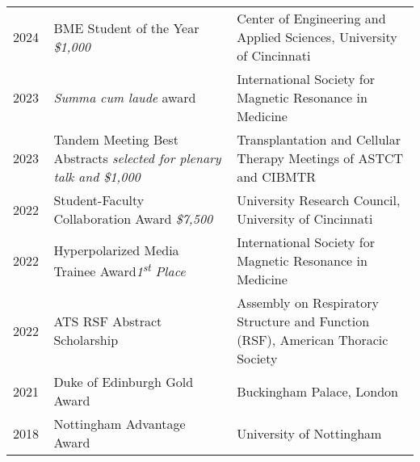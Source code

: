 \documentclass[12pt,]{scrartcl}
\begin{document}
\begin{table}[!h]
{\def\arraystretch{1.5}\tabcolsep=0pt
\begin{tabular}{p{0.10\linewidth}p{0.45\linewidth}p{0.45\linewidth}}
    2024 & BME Student of the Year \newline \textit{\$1,000}  & Center of Engineering and Applied Sciences, University of Cincinnati \\
    
    2023 & \textit{Summa cum laude} award & International Society for Magnetic Resonance in Medicine \\

    
    2023 & Tandem Meeting Best Abstracts \newline \textit{selected for plenary talk and \$1,000}  & Transplantation and Cellular Therapy \newline Meetings of ASTCT and CIBMTR \\
    
    2022 & Student-Faculty Collaboration Award \newline \textit{\$7,500} & University Research Council, University of Cincinnati \\
    
    2022 & Hyperpolarized Media Trainee Award\newline \textit{1\textsuperscript{st} Place} & International Society for Magnetic Resonance in Medicine \\
    
    
    2022 & ATS RSF Abstract Scholarship & Assembly on Respiratory Structure and Function (RSF), American Thoracic Society \\ 

  
  2021 & Duke of Edinburgh Gold Award & Buckingham Palace, London \\
  
  2018 & Nottingham Advantage Award & University of Nottingham \\

\end{tabular}%
}
\end{table}
\end{document}
